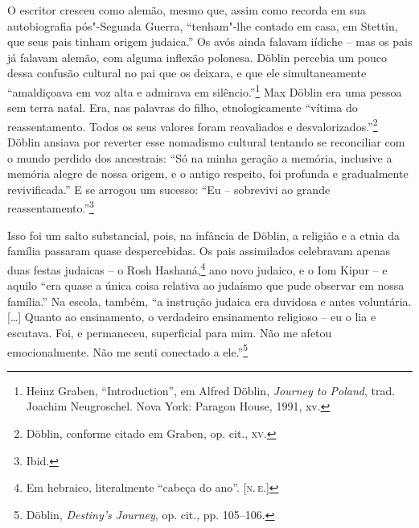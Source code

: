 O escritor cresceu como alemão, mesmo que, assim como recorda em sua
autobiografia pós"-Segunda Guerra, ``tenham"-lhe contado em casa, em
Stettin, que seus pais tinham origem judaica.'' Os avós ainda
falavam iídiche -- mas os pais já falavam alemão, com alguma inflexão
polonesa. Döblin percebia um pouco dessa confusão cultural no pai que os
deixara, e que ele simultaneamente ``amaldiçoava em voz alta e admirava
em silêncio.''\footnote{Heinz Graben, ``Introduction'', em Alfred Döblin, \textit{Journey to Poland}, trad. Joachim Neugroschel. Nova York: Paragon House, 1991, xv.} Max Döblin era uma pessoa sem terra natal. Era, nas palavras do filho, etnologicamente ``vítima do reassentamento.
Todos os seus valores foram reavaliados e desvalorizados.''\footnote{Döblin, conforme citado em Graben, op. cit., \textsc{xv}.} Döblin ansiava por reverter esse nomadismo cultural tentando se reconciliar com o mundo perdido dos
ancestrais: ``Só na minha geração a memória, inclusive a memória alegre
de nossa origem, e o antigo respeito, foi profunda e gradualmente
revivificada.'' E se arrogou um sucesso: ``Eu -- sobrevivi ao grande
reassentamento.''\footnote{Ibid.}

Isso foi um salto substancial, pois, na infância de Döblin, a religião e
a etnia da família passaram quase despercebidas. Os pais assimilados
celebravam apenas duas festas judaicas -- o Rosh Hashaná,\footnote{Em hebraico, literalmente ``cabeça do ano''. [\textsc{n.\,e.}]} ano novo judaico, e o Iom Kipur -- e
aquilo ``era quase a única coisa relativa ao judaísmo que pude observar
em nossa família.'' Na escola, também, ``a instrução judaica era
duvidosa e antes voluntária. [\ldots{}] Quanto ao ensinamento, o
verdadeiro ensinamento religioso -- eu o lia e escutava. Foi, e
permaneceu, superficial para mim. Não me afetou emocionalmente. Não me
senti conectado a ele.''\footnote{Döblin, \textit{Destiny's Journey}, op. cit., pp. 105--106.}

